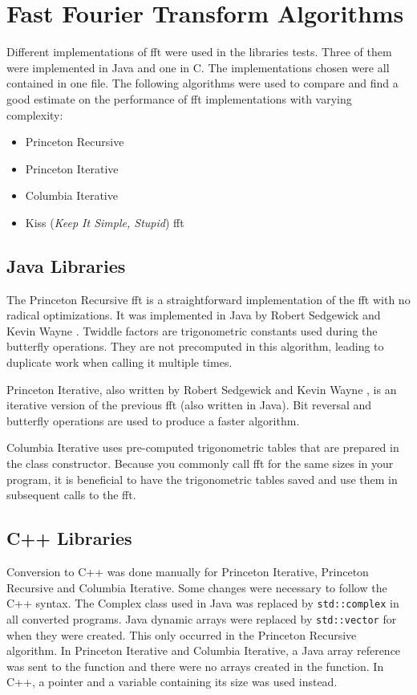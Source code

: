 \section{Fast Fourier Transform Algorithms}
Different implementations of \gls{fft} were used in the libraries tests. Three of them were implemented in Java and one in C. The implementations chosen were all contained in one file. The following algorithms were used to compare and find a good estimate on the performance of \gls{fft} implementations with varying complexity:

\begin{itemize}
    \item Princeton Recursive \cite{princeton:recursive}
    \item Princeton Iterative \cite{princeton:iterative}
    \item Columbia Iterative \cite{columbia:iterative}
    \item Kiss (\emph{Keep It Simple, Stupid}) \gls{fft} \cite{kiss:fft}
\end{itemize}

\subsection{Java Libraries}

The Princeton Recursive \gls{fft} is a straightforward implementation of the \gls{fft} with no radical optimizations. It was implemented in Java by Robert Sedgewick and Kevin Wayne \cite{princeton:recursive}. Twiddle factors are trigonometric constants used during the butterfly operations. They are not precomputed in this algorithm, leading to duplicate work when calling it multiple times.

Princeton Iterative, also written by Robert Sedgewick and Kevin Wayne \cite{princeton:iterative}, is an iterative version of the previous \gls{fft} (also written in Java). Bit reversal and butterfly operations are used to produce a faster algorithm.

Columbia Iterative \cite{columbia:iterative} uses pre-computed trigonometric tables that are prepared in the class constructor. Because you commonly call \gls{fft} for the same sizes in your program, it is beneficial to have the trigonometric tables saved and use them in subsequent calls to the \gls{fft}.

\subsection{C++ Libraries}
Conversion to C++ was done manually for Princeton Iterative, Princeton Recursive and Columbia Iterative. Some changes were necessary to follow the C++ syntax. The Complex class used in Java was replaced by \texttt{std::complex} in all converted programs. Java dynamic arrays were replaced by \texttt{std::vector} for when they were created. This only occurred in the Princeton Recursive algorithm. In Princeton Iterative and Columbia Iterative, a Java array reference was sent to the function and there were no arrays created in the function. In C++, a pointer and a variable containing its size was used instead.

